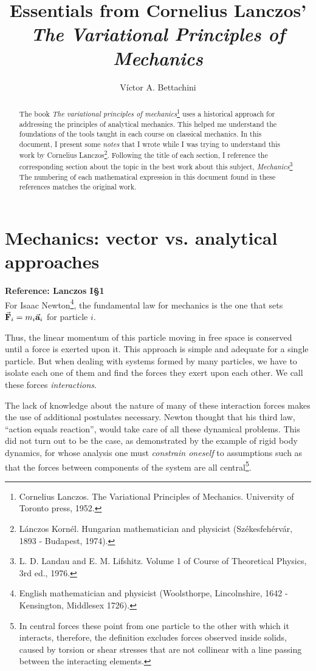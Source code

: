 \documentclass[12pt, english, a4paper]{article}
\title{Essentials from Cornelius Lanczos' \emph{The Variational Principles of Mechanics}}
\author{Víctor A. Bettachini}
\date{}
\begin{document}
\maketitle

\begin{abstract}
    The book \emph{The variational principles of mechanics}\footnote{Cornelius Lanczos. The Variational Principles of Mechanics. University of Toronto press, 1952.
    } uses a historical approach for addressing the principles of analytical mechanics.
    This helped me understand the foundations of the tools taught in each course on classical mechanics.
    In this document, I present some \emph{notes} that I wrote while I was trying to understand this work by Cornelius Lanczos\footnote{Lánczos Kornél. Hungarian mathematician and physicist (Székesfehérvár, 1893 - Budapest, 1974).}.
    Following the title of each section, I reference the corresponding section about the topic in the best work about this subject, \emph{Mechanics}\footnote{L. D. Landau and E. M. Lifshitz. Volume 1 of Course of Theoretical Physics, 3rd ed., 1976.} The numbering of each mathematical expression in this document found in these references matches the original work.
\end{abstract}


\tableofcontents

\section{Mechanics: vector vs. analytical approaches}
\textbf{Reference: Lanczos I\S1}\\

For Isaac Newton\footnote{English mathematician and physicist (Woolsthorpe, Lincolnshire, 1642 - Kensington, Middlesex 1726).}, the fundamental law for mechanics is the one that sets \(\va{F}_i= m_i \va{a}_i\) for particle \(i\).

Thus, the linear momentum of this particle moving in free space is conserved until a force is exerted upon it. This approach is simple and adequate for a single particle.
But when dealing with systems formed by many particles, we have to isolate each one of them and find the forces they exert upon each other. We call these forces \emph{interactions}.

The lack of knowledge about the nature of many of these interaction forces makes the use of additional postulates necessary.
Newton thought that his third law, ``action equals reaction'', would take care of all these dynamical problems.
This did not turn out to be the case, as demonstrated by the example of rigid body dynamics, for whose analysis one must \emph{constrain oneself} to assumptions such as that the forces between components of the system are all central\footnote{In central forces these point from one particle to the other with which it interacts, therefore, the definition excludes forces observed inside solids, caused by torsion or shear stresses that are not collinear with a line passing between the interacting elements.}.
\end{document}
